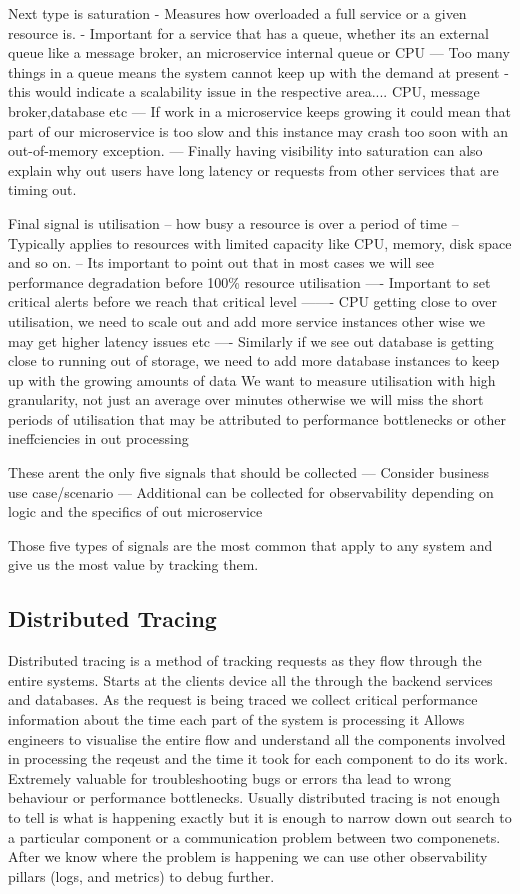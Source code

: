 \documentclass[a4paper, 11pt]{book}
\begin{document}
    Next type is saturation
    - Measures how overloaded a full service or a given resource is.
    - Important for a service that has a queue, whether its an external queue like a message broker, an microservice internal queue or CPU
    --- Too many things in a queue means the system cannot keep up with the demand at present - this would indicate a scalability issue in the respective area.... CPU, message broker,database etc
    --- If work in a microservice keeps growing it could mean that part of our microservice is too slow and this instance may crash too soon with an out-of-memory exception.
    --- Finally having visibility into saturation can also explain why out users have long latency or requests from other services that are timing out.

    Final signal is utilisation
    -- how busy a resource is over a period of time
    -- Typically applies to resources with limited capacity like CPU, memory, disk space and so on.
    -- Its important to point out that in most cases we will see performance degradation before 100\% resource utilisation
    ---- Important to set critical alerts before we reach that critical level
    ------- CPU getting close to over utilisation, we need to scale out and add more service instances other wise we may get higher latency issues etc
    ---- Similarly if we see out database is getting close to running out of storage, we need to add more database instances to keep up with the growing amounts of data
    We want to measure utilisation with high granularity, not just an average over minutes otherwise we will miss the short periods of utilisation that may be attributed to performance bottlenecks or other ineffciencies in out processing

    These arent the only five signals that should be collected
    --- Consider business use case/scenario
    --- Additional can be collected for observability depending on logic and the specifics of out microservice

    Those five types of signals are the most common that apply to any system and give us the most value by tracking them.

    \subsection{Distributed Tracing}
    Distributed tracing is a method of tracking requests as they flow through the entire systems.
    Starts at the clients device all the through the backend services and databases.
    As the request is being traced we collect critical performance information about the time each part of the system is processing it
    Allows engineers to visualise the entire flow and understand all the components involved in processing the reqeust and the time it took for each component to do its work.
    Extremely valuable for troubleshooting bugs or errors tha lead to wrong behaviour or performance bottlenecks.
    Usually distributed tracing is not enough to tell is what is happening exactly but it is enough to narrow down out search to a particular component or a communication problem between two componenets.
    After we know where the problem is happening we can use other observability pillars (logs, and metrics) to debug further.
\end{document}
